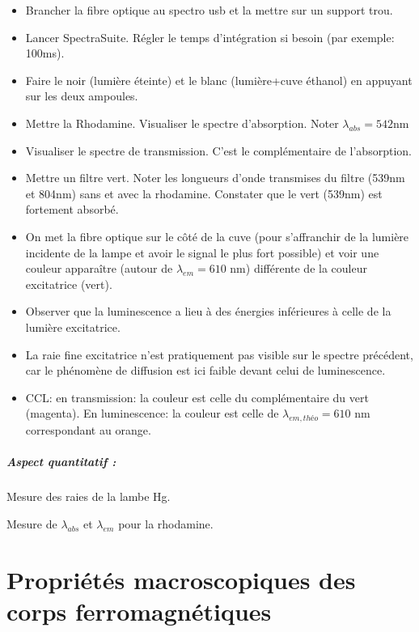 \documentclass[11pt]{report}
\numberwithin{figure}{section}
\numberwithin{equation}{section}
\numberwithin{table}{section}
\newcommand{\1}{\boldsymbol{1}}
\begin{document}
\begin{tcolorbox}[breakable, enhanced, colback=red!2!white,colframe=mycolor!85!black,title=\textbf{\textbf{Expérience}}]
\begin{itemize}[label=$\triangleright$]
\item Brancher la fibre optique au spectro usb et la mettre sur un support trou.
\item Lancer SpectraSuite. Régler le temps d'intégration si besoin (par exemple: 100ms).
\item Faire le noir (lumière éteinte) et le blanc (lumière+cuve éthanol) en appuyant sur les deux ampoules.
\item Mettre la Rhodamine. Visualiser le spectre d'absorption. Noter $\lambda_{abs} = 542$nm
\item Visualiser le spectre de transmission. C'est le complémentaire de l'absorption.
\item Mettre un filtre vert. Noter les longueurs d'onde transmises du filtre (539nm et 804nm) sans et avec la rhodamine. Constater que le vert (539nm) est fortement absorbé.
\item On met la fibre optique sur le côté de la cuve (pour s'affranchir de la lumière incidente de la lampe et avoir le signal le plus fort possible) et voir une couleur apparaître (autour de $\lambda_{em} =  610$ nm) différente de la couleur excitatrice (vert).
\item Observer que la luminescence a lieu à des énergies inférieures à celle de la lumière excitatrice.
\item La raie fine excitatrice n'est pratiquement pas visible sur le spectre précédent, car le phénomène de diffusion est ici faible devant celui de luminescence.
\item CCL: en transmission: la couleur est celle du complémentaire du vert (magenta). En luminescence: la couleur est celle de $\lambda_{em, théo} = 610$ nm correspondant au orange.
\end{itemize}

\paragraph*{Aspect quantitatif :} Mesure des raies de la lambe Hg.

Mesure de $\lambda_{abs}$ et $\lambda_  {em}$ pour la rhodamine.


\end{tcolorbox}



\newpage




\chapter{Propriétés macroscopiques des corps ferromagnétiques}
\end{document}
